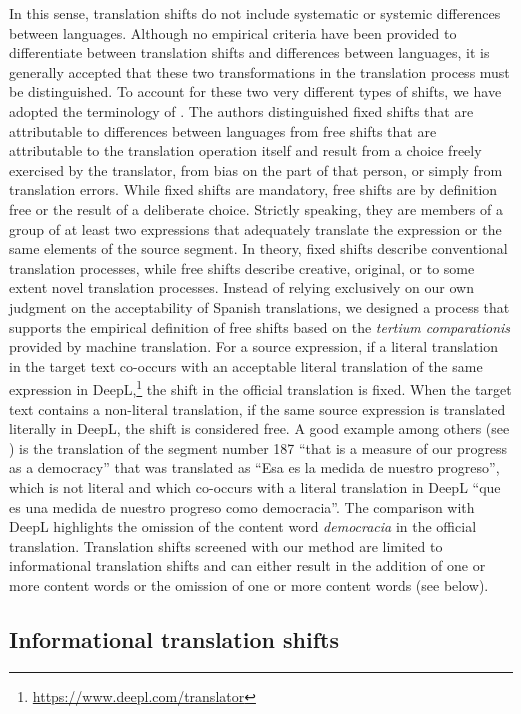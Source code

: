 \documentclass[output=paper]{langsci/langscibook}
\begin{document}
In this sense, translation shifts do not include systematic or systemic differences between languages. Although no empirical criteria have been provided to differentiate between translation shifts and differences between languages, it is generally accepted that these two transformations in the translation process must be distinguished. To account for these two very different types of shifts, we have adopted the terminology of \textcite{wecetal15}. The authors distinguished fixed shifts that are attributable to differences between languages from free shifts that are attributable to the translation operation itself and result from a choice freely exercised by the translator, from bias on the part of that person, or simply from translation errors. While fixed shifts are mandatory, free shifts are by definition free or the result of a deliberate choice. Strictly speaking, they are members of a group of at least two expressions that adequately translate the expression or the same elements of the source segment. In theory, fixed shifts describe conventional translation processes, while free shifts describe creative, original, or to some extent novel translation processes. Instead of relying exclusively on our own judgment on the acceptability of Spanish translations, we designed a process that supports the empirical definition of free shifts based on the \textit{tertium comparationis} provided by machine translation. For a source expression, if a literal translation in the target text co-occurs with an acceptable literal translation of the same expression in DeepL,\footnote{\url{https://www.deepl.com/translator}} the shift in the official translation is fixed. When the target text contains a non-literal translation, if the same source expression is translated literally in DeepL, the shift is considered free. A good example among others (see ) is the translation of the segment number 187 \enquote{that is a measure of our progress as a democracy} that was translated as \enquote{Esa es la medida de nuestro progreso}, which is not literal and which co-occurs with a literal translation in DeepL \enquote{que es una medida de nuestro progreso como democracia}. The comparison with DeepL highlights the omission of the content word \textit{democracia} in the official translation. Translation shifts screened with our method are limited to informational translation shifts and can either result in the addition of one or more content words or the omission of one or more content words (see  below).

\subsection{Informational translation shifts}
\end{document}
